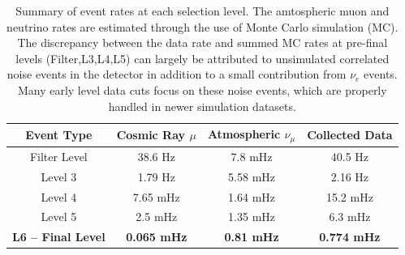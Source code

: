 \documentclass{gatech-thesis}
\begin{document}
\begin{table}[h]
\caption[Final level data rate.]{Summary of event rates at each selection level. The amtospheric muon and neutrino rates are estimated through the use of Monte Carlo simulation (MC). The discrepancy between the data rate and summed MC rates at pre-final levels (Filter,L3,L4,L5) can largely be attributed to unsimulated correlated noise events in the detector in addition to a small contribution from $\nu_e$ events. Many early level data cuts focus on these noise events, which are properly handled in newer simulation datasets.\label{tab:event_rates}}
\begin{center}
\begin{tabular}{cccc}
  \hline
 \textbf{Event Type} &\textbf{ Cosmic Ray $\mu$} &\textbf{ Atmospheric $\nu_{\mu}$} &\textbf{ Collected Data}\\
\hline
Filter Level & 38.6 Hz & 7.8 mHz & 40.5 Hz \\ 
Level 3 & 1.79 Hz & 5.58 mHz & 2.16 Hz \\ 
Level 4 & 7.65 mHz & 1.64 mHz & 15.2 mHz \\ 
Level 5 & 2.5 mHz & 1.35 mHz & 6.3 mHz \\ \hline
\textbf{L6 -- Final Level}     & \textbf{0.065 mHz} & \textbf{0.81 mHz} & \textbf{0.774 mHz} \\ \hline
\end{tabular}
\end{center}
\end{table}
\end{document}
